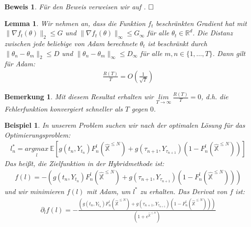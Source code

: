\documentclass[12pt,titlepage,headsepline]{article}
\newtheorem*{lemma-non}{Lemma}
\newtheorem*{beweis-non}{Beweis}
\newtheorem{beispiel}[definition]{Beispiel}
\newtheorem*{bemerkung*}{Bemerkung}
\begin{document}
      \begin{beweis-non}
        \textup{
        Für den Beweis verweisen wir auf \cite{kingma_adam_2017, Theorem 5}.
        $\hfill\Box$
        }
      \end{beweis-non}
      \begin{lemma-non}
        \textup{
        Wir nehmen an, dass die Funktion $f_t$ beschränkten Gradient hat mit $\lVert \nabla f_t(\theta) \rVert_2 \leq G$ und $\lVert \nabla f_t(\theta) \rVert_{\infty} \leq G_{\infty}$ für alle $\theta_t \in \mathbb{R}^d$. Die Distanz zwischen jede beliebige von Adam berechnete $\theta_t$ ist beschränkt durch $\lVert \theta_n - \theta_m \rVert_2 \leq D$ und $\lVert \theta_n - \theta_m \rVert_{\infty} \leq D_{\infty}$ für alle $m, n \in \{1,\ldots,T\}$. Dann gilt für Adam:
        \begin{align*}
          \frac{R(T)}{T} = O(\frac{1}{\sqrt T})
        \end{align*}
        }
      \end{lemma-non}
      \begin{bemerkung*}
        \textup{
          Mit diesem Resultat erhalten wir $\underset{T \rightarrow \infty}{lim} \ \frac{R(T)}{T} = 0$, d.h. die Fehlerfunktion konvergiert schneller als $T$ gegen $0$.
        }
      \end{bemerkung*}
      \begin{beispiel}
        \textup{
        In unserem Problem suchen wir nach der optimalen Lösung für das Optimierungsproblem:
        \begin{align*}
          l_n^* = \underset{l}{argmax} \ \mathbb{E}[g(t_n, Y_{t_n})F_n^l(\hat{\mathbb{X}}^{\leq N})+g(\tau_{n+1},Y_{\tau_{n+1}})(1-F_n^l(\hat{\mathbb{X}}^{\leq N})) ]
        \end{align*}
        Das heißt, die Zielfunktion in der Hybridmethode ist:
        \begin{align*}
          f(l) = - (g(t_n, Y_{t_n})F_n^{l}(\hat{\mathbb{X}}^{\leq N})+g(\tau_{n+1},Y_{\tau_{n+1}})(1-F_n^{l}(\hat{\mathbb{X}}^{\leq N})))
        \end{align*}
        und wir minimieren $f(l)$ mit Adam, um $l^*$ zu erhalten. Das Derivat von $f$ ist:
        \begin{align*}
          \partial_lf(l) = - \frac{(g(t_n, Y_{t_n})F_n^{l}(\hat{\mathbb{X}}^{\leq N})+g(\tau_{n+1},Y_{\tau_{n+1}})(1-F_n^{l}(\hat{\mathbb{X}}^{\leq N})))}{(1+e^{\hat{\mathbb{X}}^{\leq N}})}
        \end{align*}
        }
      \end{beispiel}
      \newpage
\end{document}

